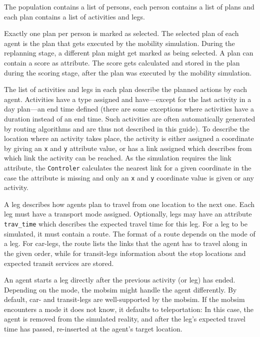 The population contains a list of persons, each person contains a list of plans and each plan contains a list of activities and legs.

Exactly one \gls{plan} per person is marked as selected. The selected plan of each agent is the plan that gets executed by the mobility simulation. During the \gls{replanning} stage, a different plan might get marked as being selected. A \gls{plan} can contain a score as attribute. The score gets calculated and stored in the plan during the scoring stage, after the plan was executed by the mobility simulation.

The list of activities and legs in each plan describe the planned actions by each agent. Activities have a type assigned and have---except for the last activity in a day plan---an end time defined (there are some exceptions where activities have a duration instead of an end time. Such activities are often automatically generated by routing algorithms and are thus not described in this guide). To describe the location where an activity takes place, the activity is either assigned a coordinate by giving an \lstinline|x| and \lstinline|y| attribute value, or has a link assigned which describes from which link the activity can be reached. As the simulation requires the link attribute, the \lstinline|Controler| calculates the nearest link for a given coordinate in the case the attribute is missing and only an \lstinline|x| and \lstinline|y| coordinate value is given or any activity.

A \gls{leg} describes how agents plan to travel from one location to the next one. Each \gls{leg} must have a transport mode assigned. Optionally, legs may have an attribute \lstinline|trav_time| which describes the expected travel time for this leg. For a leg to be simulated, it must contain a route. The format of a route depends on the mode of a leg. For car-legs, the route lists the links that the agent has to travel along in the given order, while for transit-legs information about the stop locations and expected transit services are stored.

An agent starts a leg directly after the previous activity (or leg) has ended. Depending on the mode, the \gls{mobsim} might handle the agent differently. By default, car- and transit-legs are well-supported by the \gls{mobsim}. If the \gls{mobsim} encounters a mode it does not know, it defaults to \gls{teleportation}: In this case, the agent is removed from the simulated reality, and after the leg's expected travel time has passed, re-inserted at the agent's target location.

